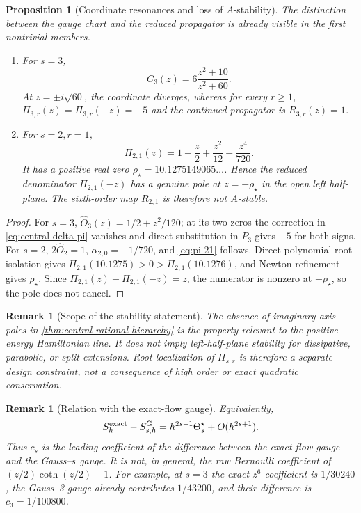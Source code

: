 \documentclass[11pt,a4paper]{article}
\newtheorem{proposition}[theorem]{Proposition}
\newtheorem{remark}[theorem]{Remark}
\begin{document}
\begin{proposition}[Coordinate resonances and loss of \(A\)-stability]
\label{prop:rational-resonance-stability}
The distinction between the gauge chart and the reduced propagator is
already visible in the first nontrivial members.
\begin{enumerate}
 \item For \(s=3\),
 \[
  C_3(z)=6\frac{z^2+10}{z^2+60}.
 \]
 At \(z=\pm i\sqrt{60}\), the coordinate diverges, whereas for every
 \(r\ge1\),
 \(\Pi_{3,r}(z)=\Pi_{3,r}(-z)=-5\) and the continued propagator is
 \(R_{3,r}(z)=1\).
 \item For \(s=2,r=1\),
 \begin{equation}\label{eq:pi-21}
  \Pi_{2,1}(z)=1+\frac z2+\frac{z^2}{12}-\frac{z^4}{720}.
 \end{equation}
 It has a positive real zero
 \(\rho_\star=10.1275149065\ldots\).  Hence the reduced denominator
 \(\Pi_{2,1}(-z)\) has a genuine pole at
 \(z=-\rho_\star\) in the open left half-plane.  The sixth-order map
 \(R_{2,1}\) is therefore not \(A\)-stable.
\end{enumerate}
\end{proposition}

\begin{proof}
For \(s=3\),
\(\widehat O_3(z)=1/2+z^2/120\); at its two zeros the correction in
\cref{eq:central-delta-pi} vanishes and direct substitution in \(P_3\)
gives \(-5\) for both signs.  For \(s=2\),
\(2\widehat O_2=1\), \(\alpha_{2,0}=-1/720\), and
\cref{eq:pi-21} follows.  Direct polynomial root isolation gives
\(\Pi_{2,1}(10.1275)>0>\Pi_{2,1}(10.1276)\), and Newton refinement gives
\(\rho_\star\).  Since
\(\Pi_{2,1}(z)-\Pi_{2,1}(-z)=z\), the numerator is nonzero at
\(-\rho_\star\), so the pole does not cancel.
\end{proof}

\begin{remark}[Scope of the stability statement]
The absence of imaginary-axis poles in
\cref{thm:central-rational-hierarchy} is the property relevant to the
positive-energy Hamiltonian line.  It does not imply left-half-plane
stability for dissipative, parabolic, or split extensions.  Root
localization of \(\Pi_{s,r}\) is therefore a separate design constraint,
not a consequence of high order or exact quadratic conservation.
\end{remark}

\begin{remark}[Relation with the exact-flow gauge]
\label{rem:order-gauge-bernoulli}
Equivalently,
\[
 S_h^{\rm exact}-S^{\rm G}_{s,h}
 =h^{2s-1}\Theta_s^\star+O(h^{2s+1}).
\]
Thus \(c_s\) is the leading coefficient of the \emph{difference}
between the exact-flow gauge and the Gauss--\(s\) gauge.  It is not, in
general, the raw Bernoulli coefficient of
\((z/2)\coth(z/2)-1\).  For example, at \(s=3\) the exact \(z^6\)
coefficient is \(1/30240\), the Gauss--3 gauge already contributes
\(1/43200\), and their difference is
\(c_3=1/100800\).
\end{remark}
\end{document}
